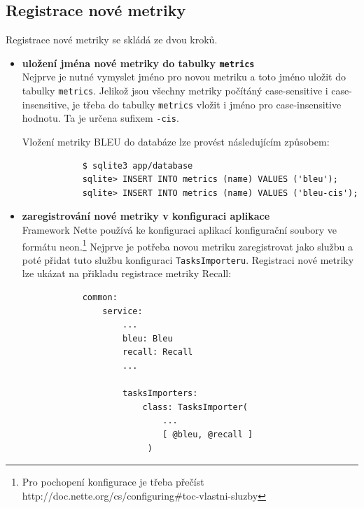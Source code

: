 \subsection{Registrace nové metriky}
Registrace nové metriky se skládá ze dvou kroků.
\begin{itemize}
	\item \textbf{uložení jména nové metriky do tabulky \texttt{metrics}} \\
		Nejprve je nutné vymyslet jméno pro novou metriku a toto jméno uložit do tabulky \texttt{metrics}. 
		Jelikož jsou všechny metriky počítáný \mbox{case-sensitive} i \mbox{case-insensitive},
		  je třeba do tabulky \texttt{metrics} vložit i jméno pro \mbox{case-insensitive} hodnotu. 
		Ta je určena sufixem \texttt{-cis}.

		Vložení metriky BLEU do databáze lze provést následujícím způsobem:
		\begin{verbatim}
			$ sqlite3 app/database
			sqlite> INSERT INTO metrics (name) VALUES ('bleu');
			sqlite> INSERT INTO metrics (name) VALUES ('bleu-cis');
		\end{verbatim}

	\item \textbf{zaregistrování nové metriky v konfiguraci aplikace} \\
		Framework Nette používá ke konfiguraci aplikací konfigurační soubory ve formátu neon.\footnote{
			Pro pochopení konfigurace je třeba přečíst http://doc.nette.org/cs/configuring\#toc-vlastni-sluzby
		}
		Nejprve je potřeba novou metriku zaregistrovat jako službu a poté přidat tuto službu konfiguraci \texttt{TasksImporteru}.
		Registraci nové metriky lze ukázat na přikladu registrace metriky Recall:


		\begin{verbatim}
			common:
			    service:
			        ...
			        bleu: Bleu
			        recall: Recall 
			        ...

			        tasksImporters:
			            class: TasksImporter(
			                ...
			                [ @bleu, @recall ]
			             )
		\end{verbatim}
\end{itemize}
